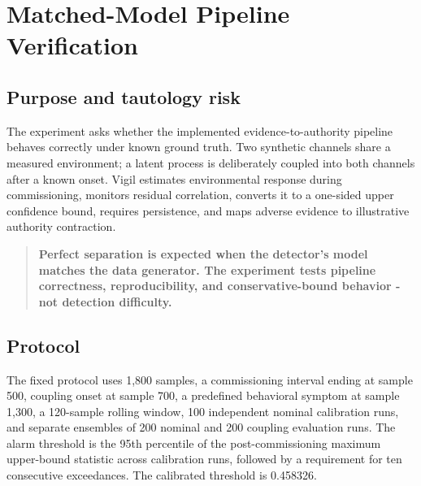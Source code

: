 \section{Matched-Model Pipeline Verification}
\subsection{Purpose and tautology risk}
The experiment asks whether the implemented evidence-to-authority pipeline behaves correctly under known ground truth. Two synthetic channels share a measured environment; a latent process is deliberately coupled into both channels after a known onset. Vigil estimates environmental response during commissioning, monitors residual correlation, converts it to a one-sided upper confidence bound, requires persistence, and maps adverse evidence to illustrative authority contraction.

\begin{quote}
\textbf{Perfect separation is expected when the detector's model matches the data generator. The experiment tests pipeline correctness, reproducibility, and conservative-bound behavior - not detection difficulty.}
\end{quote}

\subsection{Protocol}
The fixed protocol uses 1,800 samples, a commissioning interval ending at sample 500, coupling onset at sample 700, a predefined behavioral symptom at sample 1,300, a 120-sample rolling window, 100 independent nominal calibration runs, and separate ensembles of 200 nominal and 200 coupling evaluation runs. The alarm threshold is the 95th percentile of the post-commissioning maximum upper-bound statistic across calibration runs, followed by a requirement for ten consecutive exceedances. The calibrated threshold is 0.458326.

